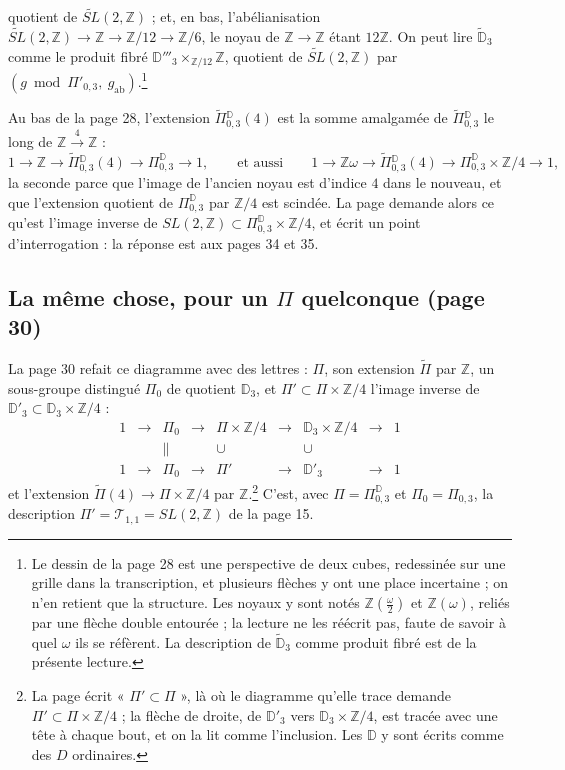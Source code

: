 \documentclass[11pt,a4paper]{article}
\begin{document}
quotient de $\widetilde{SL}(2, \mathbb{Z})$ ; et, en bas, l'abélianisation
$\widetilde{SL}(2, \mathbb{Z}) \to \mathbb{Z} \to \mathbb{Z}/12 \to
\mathbb{Z}/6$, le noyau de $\mathbb{Z} \to \mathbb{Z}$ étant $12\mathbb{Z}$. On
peut lire $\widetilde{\mathbb{D}}_3$ comme le produit fibré $\mathbb{D}'''_3
\times_{\mathbb{Z}/12} \mathbb{Z}$, quotient de $\widetilde{SL}(2, \mathbb{Z})$
par $(g \bmod \Pi'_{0,3},\ g_{\mathrm{ab}})$.\footnote{Le dessin de la page 28 est
une perspective de deux cubes, redessinée sur une grille dans la transcription, et
plusieurs flèches y ont une place incertaine ; on n'en retient que la structure.
Les noyaux y sont notés $\mathbb{Z}(\frac{\omega}{2})$ et $\mathbb{Z}(\omega)$,
reliés par une flèche double entourée ; la lecture ne les réécrit pas, faute de
savoir à quel $\omega$ ils se réfèrent. La description de
$\widetilde{\mathbb{D}}_3$ comme produit fibré est de la présente lecture.}

Au bas de la page 28, l'extension $\widetilde{\Pi}{}^{\mathbb{D}}_{0,3}(4)$ est
la somme amalgamée de $\widetilde{\Pi}{}^{\mathbb{D}}_{0,3}$ le long de
$\mathbb{Z} \xrightarrow{4} \mathbb{Z}$ :
\[
1 \to \mathbb{Z} \to \widetilde{\Pi}{}^{\mathbb{D}}_{0,3}(4) \to
\Pi^{\mathbb{D}}_{0,3} \to 1, \qquad\text{et aussi}\qquad
1 \to \mathbb{Z}\omega \to \widetilde{\Pi}{}^{\mathbb{D}}_{0,3}(4) \to
\Pi^{\mathbb{D}}_{0,3} \times \mathbb{Z}/4 \to 1 ,
\]
la seconde parce que l'image de l'ancien noyau est d'indice $4$ dans le nouveau, et
que l'extension quotient de $\Pi^{\mathbb{D}}_{0,3}$ par $\mathbb{Z}/4$ est
scindée. La page demande alors ce qu'est l'image inverse de $SL(2, \mathbb{Z})
\subset \Pi^{\mathbb{D}}_{0,3} \times \mathbb{Z}/4$, et écrit un point
d'interrogation : la réponse est aux pages 34 et 35.

\subsection*{La même chose, pour un $\Pi$ quelconque (page 30)}

La page 30 refait ce diagramme avec des lettres : $\Pi$, son extension
$\widetilde{\Pi}$ par $\mathbb{Z}$, un sous-groupe distingué $\Pi_0$ de quotient
$\mathbb{D}_3$, et $\Pi' \subset \Pi \times \mathbb{Z}/4$ l'image inverse de
$\mathbb{D}'_3 \subset \mathbb{D}_3 \times \mathbb{Z}/4$ :
\[
\begin{array}{ccccccccc}
1 & \to & \Pi_0 & \to & \Pi \times \mathbb{Z}/4 & \to & \mathbb{D}_3 \times
\mathbb{Z}/4 & \to & 1 \\
 & & \parallel & & \cup & & \cup & & \\
1 & \to & \Pi_0 & \to & \Pi' & \to & \mathbb{D}'_3 & \to & 1
\end{array}
\]
et l'extension $\widetilde{\Pi}(4) \to \Pi \times \mathbb{Z}/4$ par
$\mathbb{Z}$.\footnote{La page écrit « $\Pi' \subset \Pi$ », là où le diagramme
qu'elle trace demande $\Pi' \subset \Pi \times \mathbb{Z}/4$ ; la flèche de
droite, de $\mathbb{D}'_3$ vers $\mathbb{D}_3 \times \mathbb{Z}/4$, est tracée avec
une tête à chaque bout, et on la lit comme l'inclusion. Les $\mathbb{D}$ y sont
écrits comme des $D$ ordinaires.} C'est, avec $\Pi = \Pi^{\mathbb{D}}_{0,3}$ et
$\Pi_0 = \Pi_{0,3}$, la description $\Pi' = \mathcal{T}_{1,1} = SL(2, \mathbb{Z})$
de la page 15.
\end{document}
